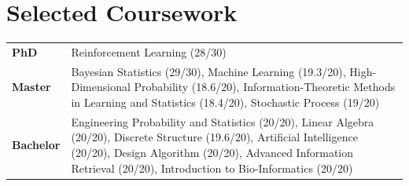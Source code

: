 \section{Selected Coursework}
\small
\begin{tabularx}{\linewidth}{@{}>{\bfseries}l@{\hspace{0.18in}}X@{}}
PhD & Reinforcement Learning (28/30) \\
Master & Bayesian Statistics (29/30), Machine Learning (19.3/20), High-Dimensional Probability (18.6/20), Information-Theoretic Methods in Learning and Statistics (18.4/20), Stochastic Process (19/20) \\
Bachelor & Engineering Probability and Statistics (20/20), Linear Algebra (20/20), Discrete Structure (19.6/20), Artificial Intelligence (20/20), Design Algorithm (20/20), Advanced Information Retrieval (20/20), Introduction to Bio-Informatics (20/20)
\end{tabularx}
\normalsize
\par
